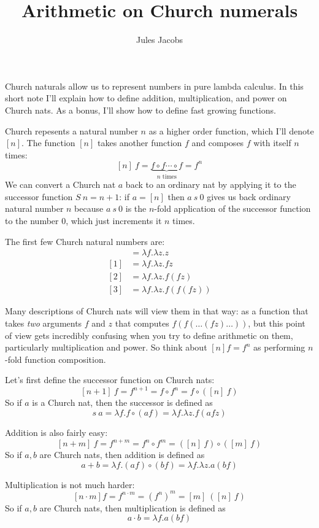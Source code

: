 \documentclass[a4paper, 11pt]{article}
\title{Arithmetic on Church numerals}
\author{Jules Jacobs}
\theoremstyle{definition}
\begin{document}
\maketitle

Church naturals allow us to represent numbers in pure lambda calculus. In this short note I'll explain how to define addition, multiplication, and power on Church nats. As a bonus, I'll show how to define fast growing functions.

Church repesents a natural number $n$ as a higher order function, which I'll denote $[n]$. The function $[n]$ takes another function $f$ and composes $f$ with itself $n$ times:
\[
  [n]\ f = \underbrace{f \circ f \cdots \circ f}_{n\text{ times}} = f^n
\]
We can convert a Church nat $a$ back to an ordinary nat by applying it to the successor function $S\ n = n+1$: if $a = [n]$ then $a\ s\ 0$ gives us back ordinary natural number $n$ because $a\ s\ 0$ is the $n$-fold application of the successor function to the number $0$, which just increments it $n$ times.

The first few Church natural numbers are:
\begin{align*}
  [0] &= \lambda f.\lambda z. z\\
  [1] &= \lambda f.\lambda z. f z\\
  [2] &= \lambda f.\lambda z.f (f z)\\
  [3] &= \lambda f.\lambda z.f (f (f z))
\end{align*}

Many descriptions of Church nats will view them in that way: as a function that takes \emph{two} arguments $f$ and $z$ that computes $f (f (\dots (f z) \dots))$, but this point of view gets incredibly confusing when you try to define arithmetic on them, particularly multiplication and power. So think about $[n] f = f^n$ as performing $n$-fold function composition.

Let's first define the successor function on Church nats:
\[
  [n + 1]\ f = f^{n+1} = f \circ f^n = f \circ ([n]\ f)
\]
So if $a$ is a Church nat, then the successor is defined as
\[
  s\ a = \lambda f. f \circ (a f) = \lambda f. \lambda z. f (a f z)
\]


Addition is also fairly easy:
\[
  [n+m]\ f = f^{n+m} = f^n \circ f^m = ([n]\ f) \circ ([m]\ f)
\]
So if $a,b$ are Church nats, then addition is defined as
\[
  a + b = \lambda f. (a f) \circ (b f) = \lambda f. \lambda z. a (b f)
\]

Multiplication is not much harder:
\[
  [n\cdot m] f = f^{n\cdot m} = (f^n)^m = [m]\ ([n]\ f)
\]
So if $a,b$ are Church nats, then multiplication is defined as
\[
  a \cdot b = \lambda f. a (b f)
\]
\end{document}

